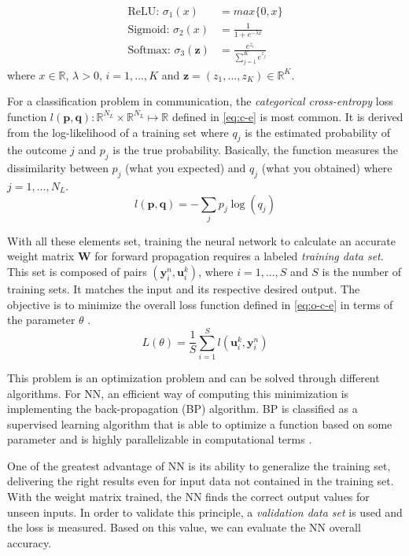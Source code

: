 \documentclass[conference]{IEEEtran}
\begin{document}
\begin{align}
	\text{ReLU: } \sigma_1 (x)& = max\{0, x\} \label{eq:relu}\\ 
	\text{Sigmoid: } \sigma_2 (x)& = \frac{1}{1+e^{- \lambda x}} \label{eq:sig}\\
	\text{Softmax: } \sigma_3 (\textbf{z})& = \frac{e^{z_i}}{\sum_{j=1}^{K}e^{z_j}}\label{eq:soft}
\end{align}
where $x \in \mathbb{R}$, $\lambda>0$, $i = 1,...,K$ and $\textbf{z} = (z_1,...,z_K) \in \mathbb{R}^K$.

For a classification problem in communication, the \textit{categorical cross-entropy} loss function $l(\textbf{p},\textbf{q}):\mathbb{R} ^{N_L}\times \mathbb{R} ^{N_L}\mapsto \mathbb{R}$ defined in \eqref{eq:c-e} is most common. It is derived from the log-likelihood of a training set where $q_j$ is the estimated probability of the outcome $j$ and $p_{j}$ is the true probability. Basically, the function measures the dissimilarity between $p_{j}$ (what you expected) and $q_{j}$ (what you obtained) \cite{murphy2013machine} where $j=1,...,N_L$.
\begin{equation}\label{eq:c-e}
	l(\textbf{p},\textbf{q})=-\sum _{j}p_{j}\log \left( q_{j}\right)
\end{equation}

With all these elements set, training the neural network to calculate an accurate weight matrix $\textbf{W}$ for forward propagation requires a labeled \textit{training data set}. This set is composed of pairs $ (\textbf{y}_{i}^{n}, {\mathbf{u}}_i^k) $, where $i=1,...,S$ and $S$ is the number of training sets. It matches the input and its respective desired output. The objective is to minimize the overall loss function defined in \eqref{eq:o-c-e} in terms of the parameter $\theta$ \cite{DBLP:journals/corr/OSheaH17}. 
\begin{equation}\label{eq:o-c-e}
L\left( \theta \right) =\dfrac {1}{S}\sum ^{S}_{i=1}l\left({\mathbf{u}}_i^k  , \textbf{y}_{i}^{n}\right)	
\end{equation}  

This problem is an optimization problem and can be solved through different algorithms. For NN, an efficient way of computing this minimization is implementing the back-propagation (BP) algorithm. 	BP is classified as a supervised learning algorithm that is able to optimize a function based on some parameter and is highly parallelizable in computational terms \cite{Ibnkahla}\cite{nielsenneural}.

One of the greatest advantage of NN is its ability to generalize the training set, delivering the right results even for input data not contained in the training set. With the weight matrix trained, the NN finds the correct output values for unseen inputs. In order to validate this principle, a \textit{validation data set} is used and the loss is measured. Based on this value, we can evaluate the NN overall accuracy.
\end{document}
